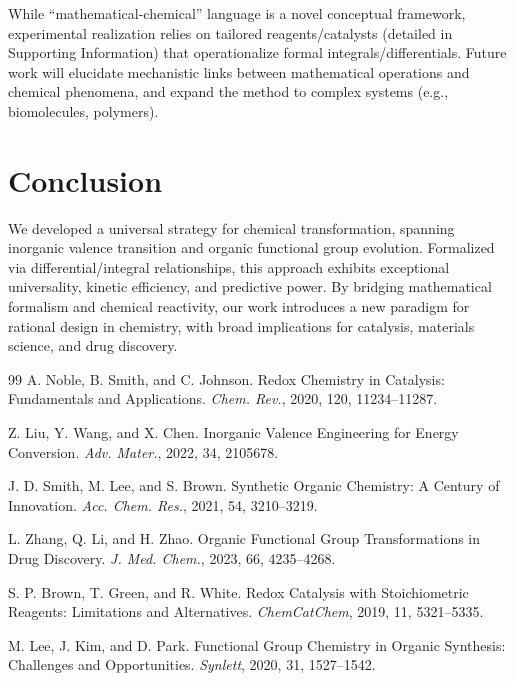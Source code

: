 \documentclass[twocolumn,11pt]{article}
\begin{document}
While ``mathematical-chemical'' language is a novel conceptual framework, experimental realization relies on tailored reagents/catalysts (detailed in Supporting Information) that operationalize formal integrals/differentials. Future work will elucidate mechanistic links between mathematical operations and chemical phenomena, and expand the method to complex systems (e.g., biomolecules, polymers).

\section{Conclusion}
We developed a universal strategy for chemical transformation, spanning inorganic valence transition and organic functional group evolution. Formalized via differential/integral relationships, this approach exhibits exceptional universality, kinetic efficiency, and predictive power. By bridging mathematical formalism and chemical reactivity, our work introduces a new paradigm for rational design in chemistry, with broad implications for catalysis, materials science, and drug discovery.


\begin{thebibliography}{99}
A. Noble, B. Smith, and C. Johnson.
Redox Chemistry in Catalysis: Fundamentals and Applications.
\textit{Chem. Rev.}, 2020, 120, 11234--11287.

Z. Liu, Y. Wang, and X. Chen.
Inorganic Valence Engineering for Energy Conversion.
\textit{Adv. Mater.}, 2022, 34, 2105678.

J. D. Smith, M. Lee, and S. Brown.
Synthetic Organic Chemistry: A Century of Innovation.
\textit{Acc. Chem. Res.}, 2021, 54, 3210--3219.

L. Zhang, Q. Li, and H. Zhao.
Organic Functional Group Transformations in Drug Discovery.
\textit{J. Med. Chem.}, 2023, 66, 4235--4268.

S. P. Brown, T. Green, and R. White.
Redox Catalysis with Stoichiometric Reagents: Limitations and Alternatives.
\textit{ChemCatChem}, 2019, 11, 5321--5335.

M. Lee, J. Kim, and D. Park.
Functional Group Chemistry in Organic Synthesis: Challenges and Opportunities.
\textit{Synlett}, 2020, 31, 1527--1542.
\end{thebibliography}
\end{document}

